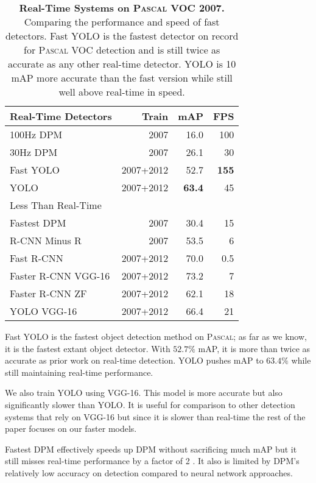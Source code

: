 \begin{table}[h]
\begin{center}
\begin{tabular}{lrrr}
Real-Time Detectors & Train & mAP & FPS\\
\hline
100Hz DPM \cite{sadeghi201430hz}& 2007 & 16.0 & 100\\
30Hz DPM \cite{sadeghi201430hz} & 2007 & 26.1 & 30 \\
Fast YOLO & 2007+2012 & 52.7 & \textbf{155} \\
YOLO & 2007+2012 & \textbf{63.4} & 45 \\
\hline
\hline
Less Than Real-Time & & \\
\hline
Fastest DPM \cite{yan2014fastest} & 2007 & 30.4 & 15 \\
R-CNN Minus R \cite{lenc2015r} & 2007 & 53.5 & 6 \\
Fast R-CNN \cite{DBLP:journals/corr/Girshick15}& 2007+2012 & 70.0 & 0.5 \\
Faster R-CNN VGG-16\cite{ren2015faster}& 2007+2012 & 73.2 & 7 \\
Faster R-CNN ZF \cite{ren2015faster}& 2007+2012 & 62.1 & 18 \\
YOLO VGG-16 & 2007+2012 & 66.4 & 21 \\
\end{tabular}
\end{center}
\caption{\small \textbf{Real-Time Systems on \textsc{Pascal} VOC 2007.} Comparing the performance and speed of fast detectors. Fast YOLO is the fastest detector on record for \textsc{Pascal} VOC detection and is still twice as accurate as any other real-time detector. YOLO is 10 mAP more accurate than the fast version while still well above real-time in speed.}
\label{timing}
\end{table}

Fast YOLO is the fastest object detection method on \textsc{Pascal}; as far as we know, it is the fastest extant object detector. With $52.7\%$ mAP, it is more than twice as accurate as prior work on real-time detection. YOLO pushes mAP to $63.4\%$ while still maintaining real-time performance.

We also train YOLO using VGG-16. This model is more accurate but also significantly slower than YOLO. It is useful for comparison to other detection systems that rely on VGG-16 but since it is slower than real-time the rest of the paper focuses on our faster models.

Fastest DPM effectively speeds up DPM without sacrificing much mAP but it still misses real-time performance by a factor of 2 \cite{yan2014fastest}. It also is limited by DPM's relatively low accuracy on detection compared to neural network approaches.

